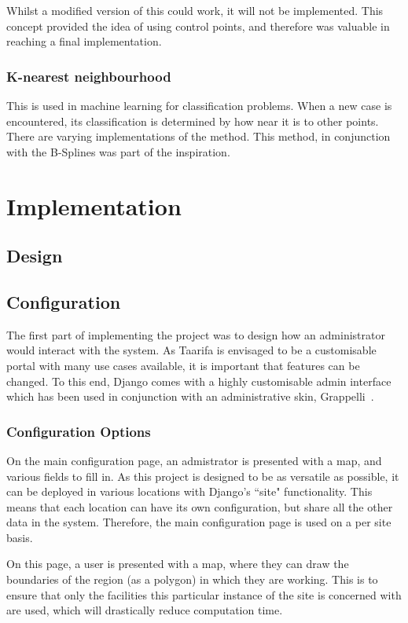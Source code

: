 Whilst a modified version of this could work, it will not be implemented. This concept provided the idea of using control points, and therefore was valuable in reaching a final implementation.

\subsection{K-nearest neighbourhood}
This is used in machine learning for classification problems. When a new case is encountered, its classification is determined by how near it is to other points. There are varying implementations of the method. This method, in conjunction with the B-Splines was part of the inspiration.

\chapter{Implementation}
\section{Design}
\section{Configuration}
The first part of implementing the project was to design how an administrator would interact with the system. As Taarifa is envisaged to be a customisable portal with many use cases available, it is important that features can be changed. To this end, Django comes with a highly customisable admin interface which has been used in conjunction with an administrative skin, Grappelli~\cite{grappelli}.

\subsection{Configuration Options}
On the main configuration page, an admistrator is presented with a map, and various fields to fill in. As this project is designed to be as versatile as possible, it can be deployed in various locations with Django's ``site" functionality. This means that each location can have its own configuration, but share all the other data in the system. Therefore, the main configuration page is used on a per site basis.

On this page, a user is presented with a map, where they can draw the boundaries of the region (as a polygon) in which they are working. This is to ensure that only the facilities this particular instance of the site is concerned with are used, which will drastically reduce computation time.

